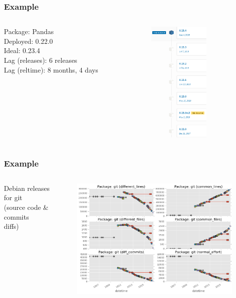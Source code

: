 \documentclass[17pt,aspectratio=169,hyperref=pdfusetitle]{beamer}
\begin{document}
\begin{frame}[fragile]
  \frametitle{Example}

\begin{columns}[T]
  \begin{column}{.68\textwidth}
  Package: Pandas \\
  Deployed: 0.22.0 \\
  Ideal: 0.23.4 \\
  \vspace{.5cm}
  Lag (releases): 6 releases \\
  Lag (reltime): 8 months, 4 days \\
\end{column}%
\hfill%
\begin{column}{.30\textwidth}
  \includegraphics[height=6cm]{figs/pandas}
\end{column}%
\end{columns}
  
\end{frame}


\begin{frame}[fragile]
  \frametitle{Example}

\begin{columns}[T]
  \begin{column}{.32\textwidth}
    Debian releases \\
    for git \\
    \vspace{.5cm}
    (source code \& \\
    commits \\
    diffs) \\
\end{column}%
\hfill%
\begin{column}{.70\textwidth}
  \includegraphics[height=6cm]{figs/git-lags-versions}
\end{column}%
\end{columns}
  
\end{frame}
\end{document}
